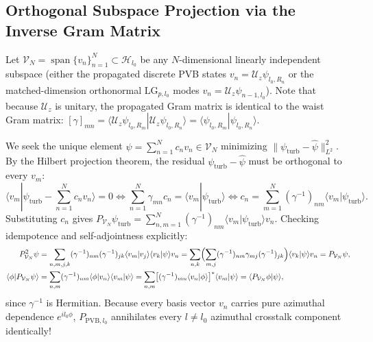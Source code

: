 \documentclass[10pt,letterpaper]{article}
\newcommand{\braket}[2]{\langle #1 | #2 \rangle}
\newcommand{\norm}[1]{\lVert #1 \rVert}
\numberwithin{equation}{section}
\begin{document}
\subsection{Orthogonal Subspace Projection via the Inverse Gram Matrix}
Let $\mathcal{V}_N = \operatorname{span}\{v_n\}_{n=1}^N \subset \mathcal{H}_{l_0}$ be any $N$-dimensional linearly independent subspace (either the propagated discrete PVB states $v_n = \mathcal{U}_z\psi_{l_0,R_n}$ or the matched-dimension orthonormal $\mathrm{LG}_{p,l_0}$ modes $v_n = \mathcal{U}_z\psi_{n-1,l_0}$). Note that because $\mathcal{U}_z$ is unitary, the propagated Gram matrix is identical to the waist Gram matrix: $[\gamma]_{mn} = \braket{\mathcal{U}_z\psi_{l_0,R_m}}{\mathcal{U}_z\psi_{l_0,R_n}} = \braket{\psi_{l_0,R_m}}{\psi_{l_0,R_n}}$.

We seek the unique element $\hat{\psi} = \sum_{n=1}^N c_n v_n \in \mathcal{V}_N$ minimizing $\norm{\psi_{\mathrm{turb}} - \hat{\psi}}_{L^2}^2$. By the Hilbert projection theorem, the residual $\psi_{\mathrm{turb}} - \hat{\psi}$ must be orthogonal to every $v_m$:
\begin{equation}
  \braket{v_m}{\psi_{\mathrm{turb}} - \sum_{n=1}^N c_n v_n} = 0 \iff \sum_{n=1}^N \gamma_{mn} c_n = \braket{v_m}{\psi_{\mathrm{turb}}} \iff c_n = \sum_{m=1}^N (\gamma^{-1})_{nm}\braket{v_m}{\psi_{\mathrm{turb}}}.
\end{equation}
Substituting $c_n$ gives $P_{\mathcal{V}_N}\psi_{\mathrm{turb}} = \sum_{n,m=1}^N (\gamma^{-1})_{nm}\braket{v_m}{\psi_{\mathrm{turb}}}v_n$. Checking idempotence and self-adjointness explicitly:
\begin{align}
  P_{\mathcal{V}_N}^2\psi &= \sum_{n,m,j,k} (\gamma^{-1})_{nm}(\gamma^{-1})_{jk}\braket{v_m}{v_j}\braket{v_k}{\psi} v_n = \sum_{n,k} \Bigl(\sum_{m,j} (\gamma^{-1})_{nm}\gamma_{mj}(\gamma^{-1})_{jk}\Bigr)\braket{v_k}{\psi}v_n = P_{\mathcal{V}_N}\psi, \\
  \braket{\phi}{P_{\mathcal{V}_N}\psi} &= \sum_{n,m} (\gamma^{-1})_{nm}\braket{\phi}{v_n}\braket{v_m}{\psi} = \sum_{n,m} \bigl[(\gamma^{-1})_{mn}\braket{v_n}{\phi}\bigr]^*\braket{v_m}{\psi} = \braket{P_{\mathcal{V}_N}\phi}{\psi},
\end{align}
since $\gamma^{-1}$ is Hermitian. Because every basis vector $v_n$ carries pure azimuthal dependence $e^{il_0\phi}$, $P_{\mathrm{PVB},l_0}$ annihilates every $l \neq l_0$ azimuthal crosstalk component identically!
\end{document}
